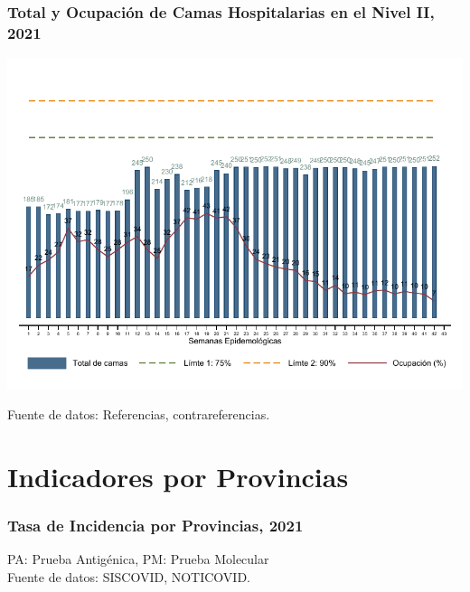 \documentclass[xcolor=table]{beamer}
\begin{document}
	\begin{frame}
		\frametitle{Total y Ocupación de Camas Hospitalarias en el Nivel II, 2021}
		\vspace{-.5cm}
		\begin{center}
			\includegraphics[width=0.8\linewidth, trim={0cm .5cm 0cm 0.2cm},clip]{../figuras/nivel_2.pdf}
		\end{center}
		{\tiny Fuente de datos: Referencias, contrareferencias.} \hyperlink{indice}{} 
	\end{frame}
	
	
\section{Indicadores por Provincias}
	\begin{frame}[label=semaforo]
		\frametitle{Tasa de Incidencia por Provincias, 2021}
		\vspace{-.5cm}
		
		\begin{table}[]
			\resizebox{\textwidth}{!}{%
				
			}
		\end{table}
		{\tiny PA: Prueba Antigénica, PM: Prueba Molecular}\\[0.5 cm]
		{\tiny Fuente de datos: SISCOVID, NOTICOVID.}
	\end{frame}
	
\end{document}
